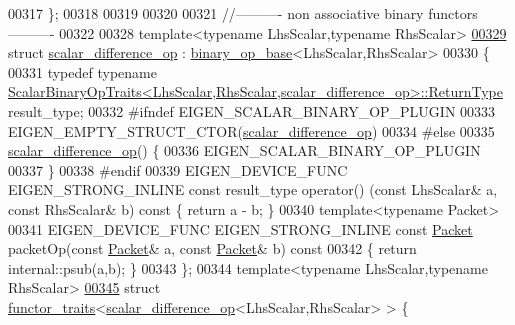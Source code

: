 \begin{DoxyCode}
00317 \};
00318 
00319 
00320 
00321 \textcolor{comment}{//---------- non associative binary functors ----------}
00322 
00328 \textcolor{keyword}{template}<\textcolor{keyword}{typename} LhsScalar,\textcolor{keyword}{typename} RhsScalar>
\hyperlink{struct_eigen_1_1internal_1_1scalar__difference__op}{00329} \textcolor{keyword}{struct }\hyperlink{struct_eigen_1_1internal_1_1scalar__difference__op}{scalar\_difference\_op} : \hyperlink{struct_eigen_1_1internal_1_1binary__op__base}{binary\_op\_base}<LhsScalar,RhsScalar>
00330 \{
00331   \textcolor{keyword}{typedef} \textcolor{keyword}{typename} 
      \hyperlink{group___core___module_struct_eigen_1_1_scalar_binary_op_traits}{ScalarBinaryOpTraits<LhsScalar,RhsScalar,scalar\_difference\_op>::ReturnType}
       result\_type;
00332 \textcolor{preprocessor}{#ifndef EIGEN\_SCALAR\_BINARY\_OP\_PLUGIN}
00333   EIGEN\_EMPTY\_STRUCT\_CTOR(\hyperlink{struct_eigen_1_1internal_1_1scalar__difference__op}{scalar\_difference\_op})
00334 \textcolor{preprocessor}{#else}
00335   \hyperlink{struct_eigen_1_1internal_1_1scalar__difference__op}{scalar\_difference\_op}() \{
00336     EIGEN\_SCALAR\_BINARY\_OP\_PLUGIN
00337   \}
00338 \textcolor{preprocessor}{#endif}
00339   EIGEN\_DEVICE\_FUNC EIGEN\_STRONG\_INLINE \textcolor{keyword}{const} result\_type operator() (\textcolor{keyword}{const} LhsScalar& a, \textcolor{keyword}{const} RhsScalar& 
      b)\textcolor{keyword}{ const }\{ \textcolor{keywordflow}{return} a - b; \}
00340   \textcolor{keyword}{template}<\textcolor{keyword}{typename} Packet>
00341   EIGEN\_DEVICE\_FUNC EIGEN\_STRONG\_INLINE \textcolor{keyword}{const} \hyperlink{union_eigen_1_1internal_1_1_packet}{Packet} packetOp(\textcolor{keyword}{const} \hyperlink{union_eigen_1_1internal_1_1_packet}{Packet}& a, \textcolor{keyword}{const} 
      \hyperlink{union_eigen_1_1internal_1_1_packet}{Packet}& b)\textcolor{keyword}{ const}
00342 \textcolor{keyword}{  }\{ \textcolor{keywordflow}{return} internal::psub(a,b); \}
00343 \};
00344 \textcolor{keyword}{template}<\textcolor{keyword}{typename} LhsScalar,\textcolor{keyword}{typename} RhsScalar>
\hyperlink{struct_eigen_1_1internal_1_1functor__traits_3_01scalar__difference__op_3_01_lhs_scalar_00_01_rhs_scalar_01_4_01_4}{00345} \textcolor{keyword}{struct }\hyperlink{struct_eigen_1_1internal_1_1functor__traits}{functor\_traits}<\hyperlink{struct_eigen_1_1internal_1_1scalar__difference__op}{scalar\_difference\_op}<LhsScalar,RhsScalar> > \{

\end{DoxyCode}
